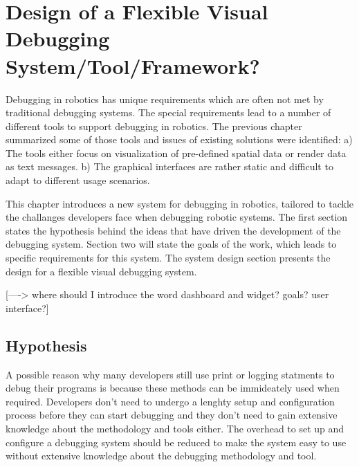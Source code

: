 \chapter{Design of a Flexible Visual Debugging System/Tool/Framework?}
\label{visual_debugging_system}

Debugging in robotics has unique requirements which are often not met by traditional debugging systems. The special requirements lead to a number of different tools to support debugging in robotics. The previous chapter summarized some of those tools and issues of existing solutions were identified: a) The tools either focus on visualization of pre-defined spatial data or render data as text messages. b) The graphical interfaces are rather static and difficult to adapt to different usage scenarios.

This chapter introduces a new system for debugging in robotics, tailored to tackle the challanges developers face when debugging robotic systems. The first section states the hypothesis behind the ideas that have driven the development of the debugging system. Section two will state the goals of the work, which leads to specific requirements for this system. The system design section presents the design for a flexible visual debugging system.

[----> where should I introduce the word dashboard and widget? goals? user interface?]




\section{Hypothesis}
A possible reason why many developers still use print or logging statments to debug their programs is because these methods can be immideately used when required. Developers don't need to undergo a lenghty setup and configuration process before they can start debugging and they don't need to gain extensive knowledge about the methodology and tools either. The overhead to set up and configure a debugging system should be reduced to make the system easy to use without extensive knowledge about the debugging methodology and tool.

